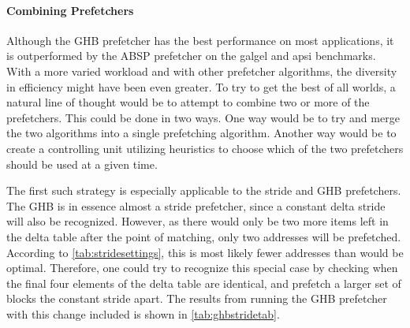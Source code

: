 \paragraph{Combining Prefetchers}
\label{par:prefcombo}
Although the GHB prefetcher has the best performance on most
applications, it is outperformed by the ABSP prefetcher on the galgel
and apsi benchmarks. With a more varied workload and with other
prefetcher algorithms, the diversity in efficiency might have been
even greater. To try to get the best of all worlds, a natural line of
thought would be to attempt to combine two or more of the
prefetchers. This could be done in two ways. One way would be to try
and merge the two algorithms into a single prefetching
algorithm. Another way would be to create a controlling unit utilizing
heuristics to choose which of the two prefetchers should be used at a
given time.

The first such strategy is especially applicable to the stride and GHB
prefetchers. The GHB is in essence almost a stride prefetcher, since a
constant delta stride will also be recognized. However, as there would
only be two more items left in the delta table after the point of
matching, only two addresses will be prefetched. According to
\autoref{tab:stridesettings}, this is most likely fewer addresses than
would be optimal. Therefore, one could try to recognize this special
case by checking when the final four elements of the delta table are
identical, and prefetch a larger set of blocks the constant stride
apart. The results from running the GHB prefetcher with this change
included is shown in \autoref{tab:ghbstridetab}.
